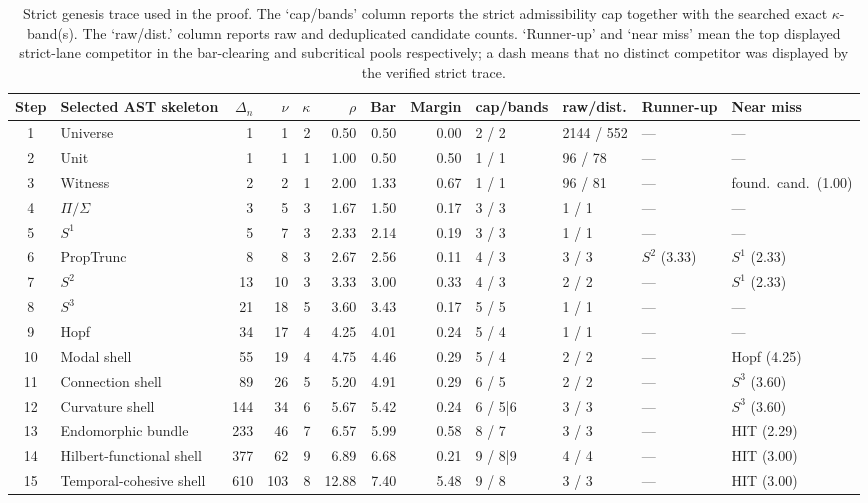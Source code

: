 \documentclass[11pt,a4paper]{article}
\theoremstyle{plain}
\theoremstyle{definition}
\theoremstyle{remark}
\begin{document}
\begin{table}[tbp]
\centering
\caption{Strict genesis trace used in the proof.
The `cap/bands' column reports the strict admissibility cap together with the
searched exact $\kappa$-band(s).
The `raw/dist.' column reports raw and deduplicated candidate counts.
`Runner-up' and `near miss' mean the top displayed strict-lane competitor in the
bar-clearing and subcritical pools respectively; a dash means that no distinct
competitor was displayed by the verified strict trace.}
\label{tab:genesis-sequence-trace}
\tiny
\setlength{\tabcolsep}{2pt}
\begin{tabular}{@{}c l r r r r r r l l >{\raggedright\arraybackslash}p{1.6cm} >{\raggedright\arraybackslash}p{1.6cm}@{}}
\toprule
Step & Selected AST skeleton & $\Delta_n$ & $\nu$ & $\kappa$ & $\rho$ & Bar & Margin & cap/bands & raw/dist. & Runner-up & Near miss \\
\midrule
1  & Universe    & 1   & 1  & 2 & 0.50 & 0.50 & 0.00 & 2 / 2   & 2144 / 552 & --- & --- \\
2  & Unit        & 1   & 1  & 1 & 1.00 & 0.50 & 0.50 & 1 / 1   & 96 / 78    & --- & --- \\
3  & Witness     & 2   & 2  & 1 & 2.00 & 1.33 & 0.67 & 1 / 1   & 96 / 81    & --- & found.\ cand.\ (1.00) \\
4  & $\Pi/\Sigma$ & 3  & 5  & 3 & 1.67 & 1.50 & 0.17 & 3 / 3   & 1 / 1      & --- & --- \\
5  & $S^1$       & 5   & 7  & 3 & 2.33 & 2.14 & 0.19 & 3 / 3   & 1 / 1      & --- & --- \\
6  & PropTrunc   & 8   & 8  & 3 & 2.67 & 2.56 & 0.11 & 4 / 3   & 3 / 3      & $S^2$ (3.33) & $S^1$ (2.33) \\
7  & $S^2$       & 13  & 10 & 3 & 3.33 & 3.00 & 0.33 & 4 / 3   & 2 / 2      & --- & $S^1$ (2.33) \\
8  & $S^3$       & 21  & 18 & 5 & 3.60 & 3.43 & 0.17 & 5 / 5   & 1 / 1      & --- & --- \\
9  & Hopf        & 34  & 17 & 4 & 4.25 & 4.01 & 0.24 & 5 / 4   & 1 / 1      & --- & --- \\
10 & Modal shell & 55  & 19 & 4 & 4.75 & 4.46 & 0.29 & 5 / 4   & 2 / 2      & --- & Hopf (4.25) \\
11 & Connection shell & 89  & 26  & 5 & 5.20  & 4.91 & 0.29 & 6 / 5   & 2 / 2      & --- & $S^3$ (3.60) \\
12 & Curvature shell & 144 & 34  & 6 & 5.67  & 5.42 & 0.24 & 6 / 5|6 & 3 / 3      & --- & $S^3$ (3.60) \\
13 & Endomorphic bundle & 233 & 46  & 7 & 6.57  & 5.99 & 0.58 & 8 / 7   & 3 / 3      & --- & HIT (2.29) \\
14 & Hilbert-functional shell & 377 & 62  & 9 & 6.89  & 6.68 & 0.21 & 9 / 8|9 & 4 / 4      & --- & HIT (3.00) \\
15 & Temporal-cohesive shell & 610 & 103 & 8 & 12.88 & 7.40 & 5.48 & 9 / 8   & 3 / 3      & --- & HIT (3.00) \\
\bottomrule
\end{tabular}
\end{table}
\end{document}
